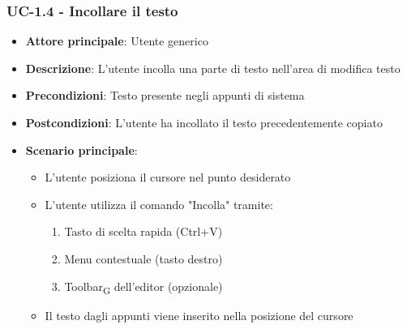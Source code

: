 \documentclass[11pt,a4paper]{article}
\newcommand{\gls}[1]{#1\textsubscript{G}}
\begin{document}
\subsubsection{UC-1.4 - Incollare il testo}
\begin{itemize}
    \item \textbf{Attore principale}: Utente generico
    \item \textbf{Descrizione}: L'utente incolla una parte di testo nell'area di modifica testo
    \item \textbf{Precondizioni}: Testo presente negli appunti di sistema
    \item \textbf{Postcondizioni}: L'utente ha incollato il testo precedentemente copiato
    \item \textbf{Scenario principale}:
        \begin{itemize}
            \item L'utente posiziona il cursore nel punto desiderato
            \item L'utente utilizza il comando "Incolla" tramite:
                \begin{enumerate}
                    \item Tasto di scelta rapida (Ctrl+V)
                    \item Menu contestuale (tasto destro)
                    \item \gls{Toolbar} dell'editor (opzionale)
                \end{enumerate}
            \item Il testo dagli appunti viene inserito nella posizione del cursore
        \end{itemize}
\end{itemize}
\end{document}

